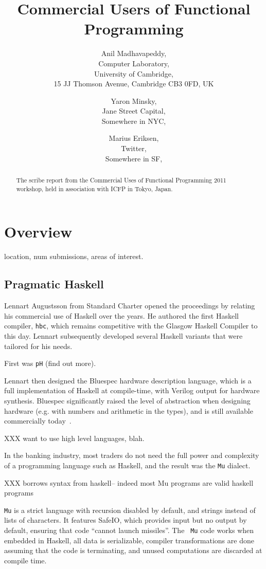 \documentclass{jfp1}
\title[Commercial Users of Functional Programming 2011]{Commercial Users of Functional Programming}
\author[Anil Madhavapeddy]
       {Anil Madhavapeddy,\\
        Computer Laboratory,\\
        University of Cambridge,\\ 
        15 JJ Thomson Avenue, Cambridge CB3 0FD, UK\\
        \email{avsm2@cl.cam.ac.uk}}
\author[Yaron Minsky]
       {Yaron Minsky,\\
        Jane Street Capital,\\
        Somewhere in NYC,\\ 
        \email{yminsky@gmail.com}}
\author[Marius Eriksen]
       {Marius Eriksen,\\
        Twitter,\\
        Somewhere in SF,\\ 
        \email{marius@twitter.com}}
\begin{document}
\label{firstpage}

\maketitle

\begin{abstract}
The scribe report from the Commercial Uses of Functional Programming 2011 workshop, held in association with ICFP in Tokyo, Japan.
\end{abstract}


\section{Overview}

location, num submissions, areas of interest. 

\subsection{Pragmatic Haskell}

Lennart Augustsson from Standard Charter opened the proceedings by relating his
commercial use of Haskell over the years. He authored the first Haskell
compiler, {\tt hbc}, which remains competitive with the Glasgow Haskell
Compiler to this day.  Lennart subsequently developed several Haskell variants
that were tailored for
his needs.

First was {\tt pH} (find out more).

Lennart then designed the Bluespec hardware description language, which is a
full implementation of Haskell at compile-time, with Verilog output for
hardware synthesis. Bluespec significantly raised the level of abstraction when
designing hardware (e.g. with numbers and arithmetic in the types), and is
still available commercially today~\cite{bluespec}.


XXX want to use high level languages, blah.

In the banking industry, most traders do not need the full power and complexity
of a programming language such as Haskell, and the result was the {\tt Mu}
dialect.


XXX borrows syntax from haskell-- indeed most Mu programs are valid haskell programs

{\tt Mu} is a strict language with recursion disabled by default, and strings
instead of lists of characters.  It features SafeIO, which provides input but
no output by default, ensuring that code ``cannot launch missiles''. The {\tt
Mu} code works when embedded in Haskell, all data is serializable, compiler
transformations are done assuming that the code is terminating, and unused
computations are discarded at compile time.
\end{document}
